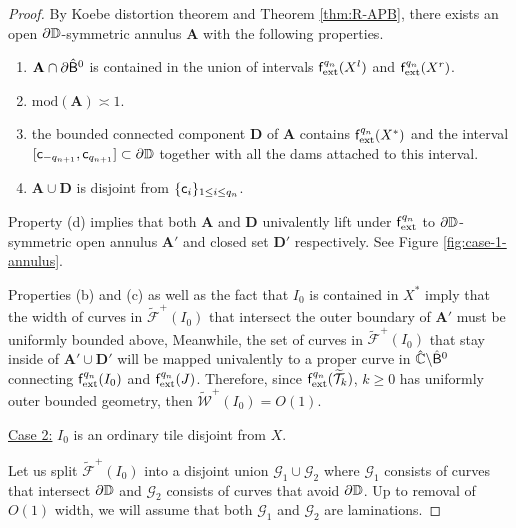 \documentclass{amsart}
\begin{document}
\begin{proof}
    By Koebe distortion theorem and Theorem \ref{thm:R-APB}, there exists an open $\partial \mathbb{D}$-symmetric annulus $\mathbf{A}$ with the following properties.
     \begin{enumerate}[label=\textnormal{(\alph*)}]
         \item $\mathbf{A} \cap \partial \hat{\mathsf{B}}^{0}$ is contained in the union of intervals $\mathsf{f}_{\textnormal{ext}}^{q_n}(X^l)$ and $\mathsf{f}_{\textnormal{ext}}^{q_n}(X^r)$.
         \item $\text{mod}(\mathbf{A}) \asymp 1$.
         \item the bounded connected component $\mathbf{D}$ of $\mathbf{A}$ contains $\mathsf{f}_{\textnormal{ext}}^{q_n}(X^*)$ and the interval $[\mathsf{c}_{-q_{n+1}}, \mathsf{c}_{q_{n+1}}] \subset \partial \mathbb{D}$ together with all the dams attached to this interval.
         \item $\mathbf{A} \cup \mathbf{D}$ is disjoint from $\{\mathsf{c}_i\}_{1\leq i \leq q_n}$.
     \end{enumerate}
    Property (d) implies that both $\mathbf{A}$ and $\mathbf{D}$ univalently lift under $\mathsf{f}_{\textnormal{ext}}^{q_n}$ to $\partial \mathbb{D}$-symmetric open annulus $\mathbf{A}'$ and closed set $\mathbf{D}'$ respectively. 
    See Figure \ref{fig:case-1-annulus}.
    
    Properties (b) and (c) as well as the fact that $I_0$ is contained in $X^*$ imply that the width of curves in $\widetilde{\mathcal{F}}^+(I_0)$ that intersect the outer boundary of $\mathbf{A}'$ must be uniformly bounded above, 
    Meanwhile, the set of curves in $\widetilde{\mathcal{F}}^+(I_0)$ that stay inside of $\mathbf{A}' \cup \mathbf{D}'$ will be mapped univalently to a proper curve in $\hat{\mathbb{C}} \backslash \hat{\mathsf{B}}^0$ connecting $\mathsf{f}_{\textnormal{ext}}^{q_n}(I_0)$ and $\mathsf{f}_{\textnormal{ext}}^{q_n}(J)$. 
    Therefore, since $\mathsf{f}_{\textnormal{ext}}^{q_n}(\widetilde{\mathcal{T}}_k)$, $k\geq 0$ has uniformly outer bounded geometry, then $\widetilde{\mathcal{W}}^+(I_0) = O(1)$.
    \vspace{0.05in}
     
    \noindent \underline{Case 2:} $I_0$ is an ordinary tile disjoint from $X$.
    \vspace{0.05in}

    Let us split $\widetilde{\mathcal{F}}^+(I_0)$ into a disjoint union $\mathcal{G}_1 \cup \mathcal{G}_2$ where $\mathcal{G}_1$ consists of curves that intersect $\partial \mathbb{D}$ and $\mathcal{G}_2$ consists of curves that avoid $\partial \mathbb{D}$. 
    Up to removal of $O(1)$ width, we will assume that both $\mathcal{G}_1$ and $\mathcal{G}_2$ are laminations.
    

\end{proof}
\end{document}
